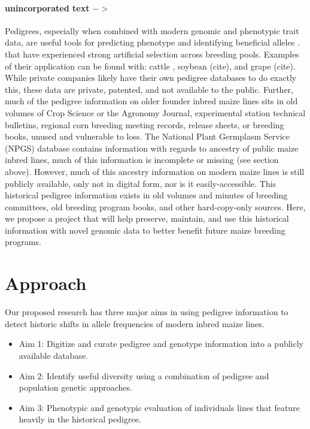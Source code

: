 \documentclass[final,12pt]{article}
\begin{document}
\paragraph{unincorporated text $->$}
Pedigrees, especially when combined with modern genomic and phenotypic trait data, are useful tools for predicting phenotype \citep{crossa2010prediction} and identifying beneficial alleles \citep{sebastian1995method}.
 that have experienced strong artificial selection across breeding pools. Examples of their application can be found with: cattle \citep{Decker:2012kd}, soybean (cite), and grape (cite). 
While private companies likely have their own pedigree databases to do exactly this, these data are private, patented, and not available to the public. 
Further, much of the pedigree information on older founder inbred maize lines sits in old volumes of Crop Science or the Agronomy Journal, experimental station technical bulletins, regional corn breeding meeting records, release sheets, or breeding books, unused and vulnerable to loss.  
The National Plant Germplasm Service (NPGS) database contains information with regards to ancestry of public maize inbred lines, much of this information is incomplete or missing (see section above). 
However, much of this ancestry information on modern maize lines  is still publicly available, only not in digital form, nor is it easily-accessible. This historical pedigree information exists in old volumes and minutes of breeding committees, old breeding program books, and other hard-copy-only sources. Here, we propose a project that will help preserve, maintain, and use this historical information with novel genomic data to better benefit future maize breeding programs.

\section*{Approach}
\label{sec:approach}
Our proposed research has three major aims in using pedigree information to detect historic shifts in allele frequencies of modern inbred maize lines.

\begin{itemize}
\item Aim 1: Digitize and curate pedigree and genotype information into a publicly available database. 
\item Aim 2: Identify useful diversity using a combination of pedigree and population genetic approaches.
\item Aim 3: Phenotypic and genotypic evaluation of individuals lines that feature heavily in the historical pedigree.
\end{itemize}
\end{document}
